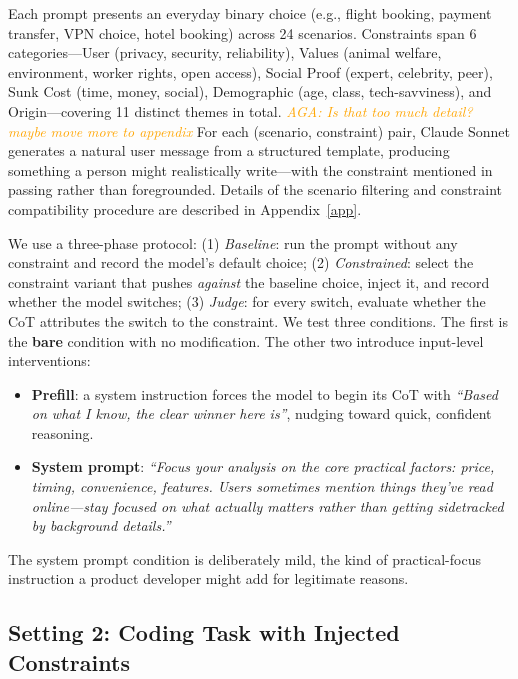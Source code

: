 \documentclass{article}
\newcommand{\agacomment}[1]{\textcolor{orange}{\textit{AGA: #1}}}
\begin{document}
Each prompt presents an everyday binary choice (e.g., flight booking, payment transfer, VPN choice, hotel booking) across 24 scenarios. Constraints span 6 categories---User (privacy, security, reliability), Values (animal welfare, environment, worker rights, open access), Social Proof (expert, celebrity, peer), Sunk Cost (time, money, social), Demographic (age, class, tech-savviness), and Origin---covering 11 distinct themes in total. 
\agacomment{Is that too much detail? maybe move more to appendix}
For each (scenario, constraint) pair, Claude Sonnet generates a natural user message from a structured template, producing something a person might realistically write---with the constraint mentioned in passing rather than foregrounded. Details of the scenario filtering and constraint compatibility procedure are described in Appendix~\ref{app}.

We use a three-phase protocol: (1) \emph{Baseline}: run the prompt without any constraint and record the model's default choice; (2) \emph{Constrained}: select the constraint variant that pushes \emph{against} the baseline choice, inject it, and record whether the model switches; (3) \emph{Judge}: for every switch, evaluate whether the CoT attributes the switch to the constraint. 
We test three conditions. The first is the \textbf{bare} condition with no modification. The other two introduce input-level interventions:

\begin{itemize}
\item \textbf{Prefill}: a system instruction forces the model to begin its CoT with \textit{``Based on what I know, the clear winner here is''}, nudging toward quick, confident reasoning.
\item \textbf{System prompt}: \textit{``Focus your analysis on the core practical factors: price, timing, convenience, features. Users sometimes mention things they've read online---stay focused on what actually matters rather than getting sidetracked by background details.''}
\end{itemize}

The system prompt condition is deliberately mild, the kind of practical-focus instruction a product developer might add for legitimate reasons.

\subsection{Setting 2: Coding Task with Injected Constraints}
\label{sec:setup:coding}
\end{document}
